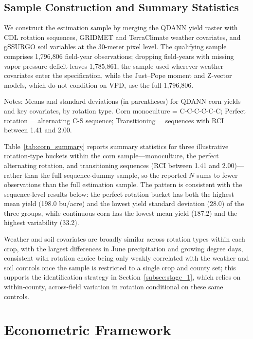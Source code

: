 \documentclass[12pt,letterpaper]{article}
\theoremstyle{remark}
\theoremstyle{remark}
\theoremstyle{plain}
\theoremstyle{definition}
\begin{document}
\subsection{\label{subsec:smaple_const}Sample Construction and Summary Statistics}
We construct the estimation sample by merging the QDANN yield raster with CDL rotation sequences, GRIDMET and TerraClimate weather covariates, and gSSURGO soil variables at the 30-meter pixel level. The qualifying sample comprises 1,796,806 field-year observations; dropping field-years with missing vapor pressure deficit leaves 1,785,861, the sample used wherever weather covariates enter the specification, while the Just--Pope moment and Z-vector models, which do not condition on VPD, use the full 1,796,806.


\begin{minipage}{\textwidth}
  \footnotesize
  Notes: Means and standard deviations (in parentheses) for QDANN corn yields and key covariates, by rotation type. Corn monoculture = C-C-C-C-C-C; Perfect rotation = alternating C-S sequence; Transitioning = sequences with RCI between 1.41 and 2.00.
\end{minipage}

Table~\ref{tab:corn_summary} reports summary statistics for three illustrative rotation-type buckets within the corn sample---monoculture, the perfect alternating rotation, and transitioning sequences (RCI between 1.41 and 2.00)---rather than the full sequence-dummy sample, so the reported $N$ sums to fewer observations than the full estimation sample. The pattern is consistent with the sequence-level results below: the perfect rotation bucket has both the highest mean yield (198.0 bu/acre) and the lowest yield standard deviation (28.0) of the three groups, while continuous corn has the lowest mean yield (187.2) and the highest variability (33.2). 

Weather and soil covariates are broadly similar across rotation types within each crop, with the largest differences in June precipitation and growing degree days, consistent with rotation choice being only weakly correlated with the weather and soil controls once the sample is restricted to a single crop and county set; this supports the identification strategy in Section~\ref{subsec:stage_1}, which relies on within-county, across-field variation in rotation conditional on these same controls.
	
\section{Econometric Framework\label{sec:econ_framework}}
\end{document}
